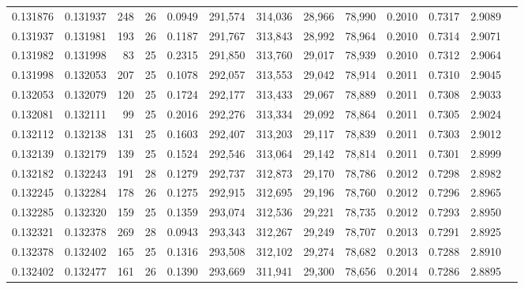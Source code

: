\begin{tabular}{rrrrrrrrrrrrr}
0.131876 & 0.131937 & 248 &  26 &                                     0.0949 & 291,574 & 314,036 &  28,966 &  78,990 & 0.2010 & 0.7317 & 2.9089 \\
0.131937 & 0.131981 & 193 &  26 &                                     0.1187 & 291,767 & 313,843 &  28,992 &  78,964 & 0.2010 & 0.7314 & 2.9071 \\
0.131982 & 0.131998 &  83 &  25 &                                     0.2315 & 291,850 & 313,760 &  29,017 &  78,939 & 0.2010 & 0.7312 & 2.9064 \\
0.131998 & 0.132053 & 207 &  25 &                                     0.1078 & 292,057 & 313,553 &  29,042 &  78,914 & 0.2011 & 0.7310 & 2.9045 \\
0.132053 & 0.132079 & 120 &  25 &                                     0.1724 & 292,177 & 313,433 &  29,067 &  78,889 & 0.2011 & 0.7308 & 2.9033 \\
0.132081 & 0.132111 &  99 &  25 &                                     0.2016 & 292,276 & 313,334 &  29,092 &  78,864 & 0.2011 & 0.7305 & 2.9024 \\
0.132112 & 0.132138 & 131 &  25 &                                     0.1603 & 292,407 & 313,203 &  29,117 &  78,839 & 0.2011 & 0.7303 & 2.9012 \\
0.132139 & 0.132179 & 139 &  25 &                                     0.1524 & 292,546 & 313,064 &  29,142 &  78,814 & 0.2011 & 0.7301 & 2.8999 \\
0.132182 & 0.132243 & 191 &  28 &                                     0.1279 & 292,737 & 312,873 &  29,170 &  78,786 & 0.2012 & 0.7298 & 2.8982 \\
0.132245 & 0.132284 & 178 &  26 &                                     0.1275 & 292,915 & 312,695 &  29,196 &  78,760 & 0.2012 & 0.7296 & 2.8965 \\
0.132285 & 0.132320 & 159 &  25 &                                     0.1359 & 293,074 & 312,536 &  29,221 &  78,735 & 0.2012 & 0.7293 & 2.8950 \\
0.132321 & 0.132378 & 269 &  28 &                                     0.0943 & 293,343 & 312,267 &  29,249 &  78,707 & 0.2013 & 0.7291 & 2.8925 \\
0.132378 & 0.132402 & 165 &  25 &                                     0.1316 & 293,508 & 312,102 &  29,274 &  78,682 & 0.2013 & 0.7288 & 2.8910 \\
0.132402 & 0.132477 & 161 &  26 &                                     0.1390 & 293,669 & 311,941 &  29,300 &  78,656 & 0.2014 & 0.7286 & 2.8895 \\

\end{tabular}
